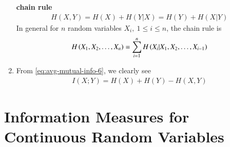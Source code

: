 \documentclass[journal,12pt,twocolumn]{IEEEtran}
\renewcommand\thesection{\arabic{section}}
\begin{document}
\begin{enumerate}[label=\thesection.\arabic*, ref=\thesection.\theenumi]
    \textbf{chain rule}
    \begin{align}
        H(X,Y) = H(X) + H(Y|X) = H(Y) + H(X|Y) \label{eq:chain-rule-two}
    \end{align}
    In general for $n$ random variables $X_i,\ 1 \le i \le n$, the chain rule is 
    \begin{align}
        H\left(X_1,X_2,\ldots,X_n\right) = \sum_{i=1}^n H\left(X_i|X_1,X_2,\ldots,X_{i-1}\right)
        \label{eq:chain-rule-gen}
    \end{align}
    \item From \eqref{eq:avg-mutual-info-6}, we clearly see
    \begin{align}
        I(X;Y) = H(X) + H(Y) - H(X,Y) \label{eq:mutual-self-eqn}
    \end{align}
\end{enumerate}

\section{Information Measures for Continuous Random Variables}
\end{document}
